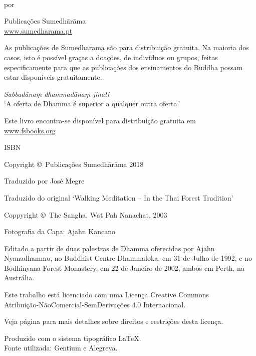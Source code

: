 \cleartoverso
\thispagestyle{empty}

{\copyrightsize
\centering
\setlength{\parindent}{0pt}%
\setlength{\parskip}{0.8\baselineskip}%

\thetitle\\
por \theauthor

Publicações Sumedhārāma\\
\href{http://sumedharama.pt}{www.sumedharama.pt}

As publicações de Sumedharama são para distribuição gratuita. Na maioria
dos casos, isto é possível graças a doações, de indivíduos ou grupos,
feitas especificamente para que as publicações dos ensinamentos do
Buddha possam estar disponíveis gratuitamente.

\textit{Sabbadānaṃ dhammadānaṃ jinati}\\
`A oferta de Dhamma é superior a qualquer outra oferta.'

Este livro encontra-se disponível para distribuição gratuita em\\
\href{http://fsbooks.org/}{www.fsbooks.org}

ISBN \theISBN

Copyright \copyright\ Publicações Sumedhārāma 2018

Traduzido por José Megre

Traduzido do original `Walking Meditation -- In the Thai Forest Tradition'

Coppyright \copyright\ The Sangha, Wat Pah Nanachat, 2003

Fotografia da Capa: Ajahn Kancano

Editado a partir de duas palestras de Dhamma oferecidas por
Ajahn Nyanadhammo, no Buddhist Centre Dhammaloka, em 31 de Julho de
1992, e no Bodhinyana Forest Monastery, em 22 de Janeiro de 2002, ambos
em Perth, na Austrália.

\vfill

{\footnotesize

Este trabalho está licenciado com uma Licença Creative Commons\\
Atribuição-NãoComercial-SemDerivações 4.0 Internacional.

Veja página \pageref{copyright-details} para mais detalhes sobre direitos e restrições desta licença.

Produzido com o sistema tipográfico \LaTeX.\\
Fonte utilizada: Gentium e Alegreya.

\theEditionInfo

}}
